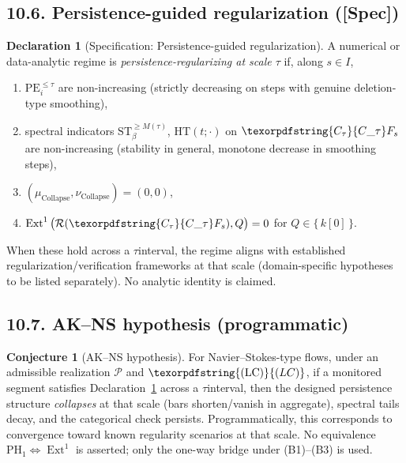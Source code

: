 \documentclass[11pt]{article}
\numberwithin{equation}{section}
\theoremstyle{plain}
\theoremstyle{definition}
\theoremstyle{remark}
\DeclareMathOperator{\Ext}{Ext}
\DeclareRobustCommand{\hyp}{\nobreakdash-}
\newcommand{\Rfun}{\mathcal{R}}
\theoremstyle{plain}
\theoremstyle{definition}
\numberwithin{equation}{section}
\newtheorem{conjecture}{Conjecture}[section]
\theoremstyle{definition}
\newtheorem{declaration}[theorem]{Declaration}
\DeclareRobustCommand{\Ctau}{\texorpdfstring{\ensuremath{C_{\tau}}}{C\_\tau}}
\DeclareRobustCommand{\muc}{\mu_{\mathrm{Collapse}}}
\DeclareRobustCommand{\nuc}{\nu_{\mathrm{Collapse}}}
\DeclareRobustCommand{\LC}{\texorpdfstring{\ensuremath{\mathrm{(LC)}}}{(LC)}}
\DeclareRobustCommand{\Qtest}{\{\,k[0]\,\}}
\numberwithin{equation}{section}
\theoremstyle{plain}
\theoremstyle{definition}
\theoremstyle{remark}
\providecommand{\Cfun}[1]{\mathsf{C}_{#1}}
\providecommand{\Ctau}{\Cfun{\tau}}
\providecommand{\muc}{\mu_{\mathrm{Collapse}}}
\providecommand{\nuc}{\nu_{\mathrm{Collapse}}}
\begin{document}
\subsection*{10.6. Persistence\hyp guided regularization ([Spec])}
\begin{declaration}[Specification: Persistence\hyp guided regularization]\label{spec:10-PGR}
A numerical or data\hyp analytic regime is \emph{persistence\hyp regularizing at scale \(\tau\)} if, along \(s\in I\),
\begin{enumerate}
  \item \(\mathrm{PE}_i^{\le \tau}\) are non\hyp increasing (strictly decreasing on steps with genuine deletion\hyp type smoothing),
  \item spectral indicators \(\mathrm{ST}_\beta^{\ge M(\tau)}\), \(\mathrm{HT}(t;\cdot)\) on \(\Ctau F_s\) are non\hyp increasing (stability in general, monotone decrease in smoothing steps),
  \item \((\muc,\nuc)=(0,0)\),
  \item \(\Ext^1\big(\Rfun(\Ctau F_s),Q\big)=0\) for \(Q\in\Qtest\).
\end{enumerate}
When these hold across a \(\tau\)\nobreakdash interval, the regime aligns with established regularization/verification frameworks at that scale (domain\hyp specific hypotheses to be listed separately). No analytic identity is claimed.
\end{declaration}

\subsection*{10.7. AK--NS hypothesis (programmatic)}
\begin{conjecture}[AK--NS hypothesis]\label{conj:10-AKNS}
For Navier–Stokes\hyp type flows, under an admissible realization \(\mathcal{P}\) and \(\LC\), if a monitored segment satisfies Declaration~\ref{spec:10-PGR} across a \(\tau\)\nobreakdash interval, then the designed persistence structure \emph{collapses} at that scale (bars shorten/vanish in aggregate), spectral tails decay, and the categorical check persists.
Programmatically, this corresponds to convergence toward known regularity scenarios at that scale.
No equivalence \(\mathrm{PH}_1\Leftrightarrow\Ext^1\) is asserted; only the one\hyp way bridge under (B1)–(B3) is used.
\end{conjecture}
\end{document}
